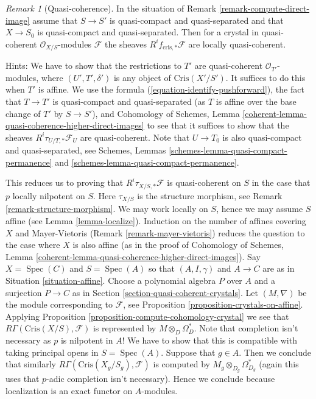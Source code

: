 \documentclass{stacks-project}
\theoremstyle{plain}
\theoremstyle{definition}
\theoremstyle{remark}
\newtheorem{remark}[subsection]{Remark}
\numberwithin{equation}{subsection}
\def\Spec{\mathop{\mathrm{Spec}}}
\begin{document}
\begin{remark}[Quasi-coherence]
\label{remark-quasi-coherent}
In the situation of Remark \ref{remark-compute-direct-image}
assume that $S \to S'$ is quasi-compact and quasi-separated and
that $X \to S_0$ is quasi-compact and quasi-separated. Then for a crystal
in quasi-coherent $\mathcal{O}_{X/S}$-modules $\mathcal{F}$
the sheaves $R^if_{\text{cris}, *}\mathcal{F}$ are locally quasi-coherent.

\medskip\noindent
Hints: We have to show that the restrictions to $T'$ are quasi-coherent
$\mathcal{O}_{T'}$-modules, where $(U', T', \delta')$ is any object of
$\text{Cris}(X'/S')$. It suffices to do this when $T'$ is affine.
We use the formula (\ref{equation-identify-pushforward}),
the fact that $T \to T'$ is quasi-compact and quasi-separated (as $T$
is affine over the base change of $T'$ by $S \to S'$), and
Cohomology of Schemes, Lemma
\ref{coherent-lemma-quasi-coherence-higher-direct-images}
to see that it suffices to show that the sheaves
$R^i\tau_{U/T, *}\mathcal{F}_U$ are quasi-coherent.
Note that $U \to T_0$ is also quasi-compact and quasi-separated, see
Schemes, Lemmas \ref{schemes-lemma-quasi-compact-permanence} and
\ref{schemes-lemma-quasi-compact-permanence}.

\medskip\noindent
This reduces us to proving that $R^i\tau_{X/S, *}\mathcal{F}$
is quasi-coherent on $S$ in the case that $p$ locally nilpotent on $S$. Here
$\tau_{X/S}$ is the structure morphism, see
Remark \ref{remark-structure-morphism}.
We may work locally on $S$, hence we may assume $S$ affine
(see Lemma \ref{lemma-localize}). Induction on the number
of affines covering $X$ and Mayer-Vietoris
(Remark \ref{remark-mayer-vietoris}) reduces the question to
the case where $X$ is also affine (as in the proof of
Cohomology of Schemes, Lemma
\ref{coherent-lemma-quasi-coherence-higher-direct-images}).
Say $X = \Spec(C)$ and $S = \Spec(A)$ so that $(A, I, \gamma)$ and
$A \to C$ are as
in Situation \ref{situation-affine}. Choose a polynomial algebra
$P$ over $A$ and a surjection $P \to C$ as in
Section \ref{section-quasi-coherent-crystals}.
Let $(M, \nabla)$ be the module corresponding to $\mathcal{F}$, see
Proposition \ref{proposition-crystals-on-affine}.
Applying 
Proposition \ref{proposition-compute-cohomology-crystal}
we see that $R\Gamma(\text{Cris}(X/S), \mathcal{F})$ is represented by
$M \otimes_D \Omega_D^*$. Note that completion isn't necessary
as $p$ is nilpotent in $A$! We have to show that this is compatible
with taking principal opens in $S = \Spec(A)$. Suppose that $g \in A$.
Then we conclude that similarly $R\Gamma(\text{Cris}(X_g/S_g), \mathcal{F})$
is computed by $M_g \otimes_{D_g} \Omega_{D_g}^*$ (again this uses that
$p$-adic completion isn't necessary). Hence we conclude because localization
is an exact functor on $A$-modules.
\end{remark}
\end{document}
